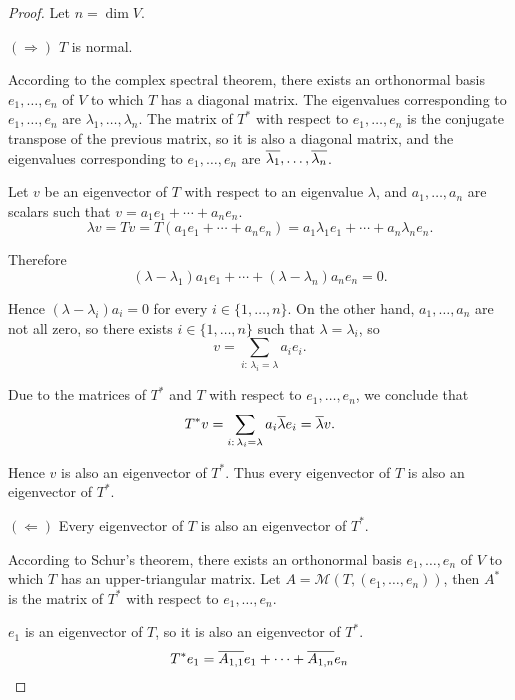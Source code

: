 \begin{proof}
    Let $n = \dim V$.

    $(\Rightarrow)$ $T$ is normal.

    According to the complex spectral theorem, there exists an orthonormal basis $e_{1}, \ldots, e_{n}$ of $V$ to which $T$ has a diagonal matrix. The eigenvalues corresponding to $e_{1}, \ldots, e_{n}$ are $\lambda_{1}, \ldots, \lambda_{n}$. The matrix of $T^{*}$ with respect to $e_{1}, \ldots, e_{n}$ is the conjugate transpose of the previous matrix, so it is also a diagonal matrix, and the eigenvalues corresponding to $e_{1}, \ldots, e_{n}$ are $\overline{\lambda_{1}}, \ldots, \overline{\lambda_{n}}$.

    Let $v$ be an eigenvector of $T$ with respect to an eigenvalue $\lambda$, and $a_{1}, \ldots, a_{n}$ are scalars such that $v = a_{1}e_{1} + \cdots + a_{n}e_{n}$.
    \[
        \lambda v = Tv = T(a_{1}e_{1} + \cdots + a_{n}e_{n}) = a_{1}\lambda_{1}e_{1} + \cdots + a_{n}\lambda_{n}e_{n}.
    \]

    Therefore
    \[
        (\lambda - \lambda_{1})a_{1}e_{1} + \cdots + (\lambda - \lambda_{n})a_{n}e_{n} = 0.
    \]

    Hence $(\lambda - \lambda_{i})a_{i} = 0$ for every $i\in\{1,\ldots, n\}$. On the other hand, $a_{1}, \ldots, a_{n}$ are not all zero, so there exists $i\in \{1,\ldots, n\}$ such that $\lambda = \lambda_{i}$, so
    \[
        v = \sum_{i:\,\lambda_{i} = \lambda}a_{i}e_{i}.
    \]

    Due to the matrices of $T^{*}$ and $T$ with respect to $e_{1}, \ldots, e_{n}$, we conclude that
    \[
        T^{*}v = \sum_{i:\,\lambda_{i} = \lambda}a_{i}\overline{\lambda}e_{i} = \overline{\lambda}v.
    \]

    Hence $v$ is also an eigenvector of $T^{*}$. Thus every eigenvector of $T$ is also an eigenvector of $T^{*}$.

    \bigskip

    $(\Leftarrow)$ Every eigenvector of $T$ is also an eigenvector of $T^{*}$.

    According to Schur's theorem, there exists an orthonormal basis $e_{1}, \ldots, e_{n}$ of $V$ to which $T$ has an upper-triangular matrix. Let $A = \mathcal{M}(T, (e_{1}, \ldots, e_{n}))$, then $A^{*}$ is the matrix of $T^{*}$ with respect to $e_{1}, \ldots, e_{n}$.

    $e_{1}$ is an eigenvector of $T$, so it is also an eigenvector of $T^{*}$.
    \[
        T^{*}e_{1} = \overline{A_{1,1}}e_{1} + \cdots + \overline{A_{1,n}}e_{n}
    \]


\end{proof}
